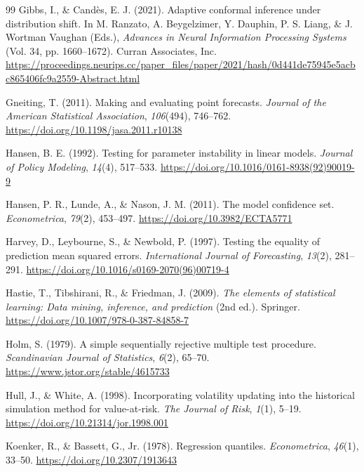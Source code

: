 \documentclass[11pt,a4paper]{article}
\begin{document}
\begin{thebibliography}{99}
 Gibbs, I., \& Candès, E. J. (2021). Adaptive conformal inference under distribution shift. In M. Ranzato, A. Beygelzimer, Y. Dauphin, P. S. Liang, \& J. Wortman Vaughan (Eds.), \emph{Advances in Neural Information Processing Systems} (Vol. 34, pp. 1660--1672). Curran Associates, Inc. \url{https://proceedings.neurips.cc/paper_files/paper/2021/hash/0d441de75945e5acbc865406fc9a2559-Abstract.html}

 Gneiting, T. (2011). Making and evaluating point forecasts. \emph{Journal of the American Statistical Association}, \emph{106}(494), 746--762. \url{https://doi.org/10.1198/jasa.2011.r10138}

 Hansen, B. E. (1992). Testing for parameter instability in linear models. \emph{Journal of Policy Modeling}, \emph{14}(4), 517--533. \url{https://doi.org/10.1016/0161-8938(92)90019-9}

 Hansen, P. R., Lunde, A., \& Nason, J. M. (2011). The model confidence set. \emph{Econometrica}, \emph{79}(2), 453--497. \url{https://doi.org/10.3982/ECTA5771}


\raggedright

 Harvey, D., Leybourne, S., \& Newbold, P. (1997). Testing the equality of prediction mean squared errors. \emph{International Journal of Forecasting}, \emph{13}(2), 281--291. \url{https://doi.org/10.1016/s0169-2070(96)00719-4}

 Hastie, T., Tibshirani, R., \& Friedman, J. (2009). \emph{The elements of statistical learning: Data mining, inference, and prediction} (2nd ed.). Springer. \url{https://doi.org/10.1007/978-0-387-84858-7}

 Holm, S. (1979). A simple sequentially rejective multiple test procedure. \emph{Scandinavian Journal of Statistics}, \emph{6}(2), 65--70. \url{https://www.jstor.org/stable/4615733}

 Hull, J., \& White, A. (1998). Incorporating volatility updating into the historical simulation method for value-at-risk. \emph{The Journal of Risk}, \emph{1}(1), 5--19. \url{https://doi.org/10.21314/jor.1998.001}

 Koenker, R., \& Bassett, G., Jr. (1978). Regression quantiles. \emph{Econometrica}, \emph{46}(1), 33--50. \url{https://doi.org/10.2307/1913643}


\end{thebibliography}
\end{document}
